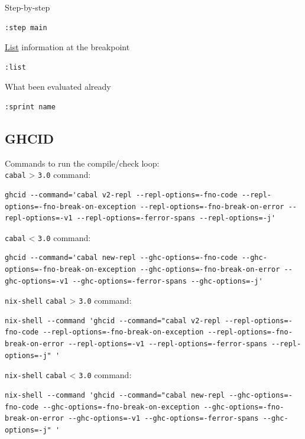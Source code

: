 \documentclass[11pt]{article}
\begin{document}
Step-by-step\\
\begin{verbatim}
:step main
\end{verbatim}

\hyperref[org8ae0f28]{List} information at the breakpoint\\
\begin{verbatim}
:list
\end{verbatim}

What been evaluated already\\
\begin{verbatim}
:sprint name
\end{verbatim}

\subsection{\label{org03f95e6}GHCID}
\label{sec:orgedd3dea}

Commands to run the compile/check loop:\\

\texttt{cabal} > \texttt{3.0} command:\\
\begin{verbatim}
ghcid --command='cabal v2-repl --repl-options=-fno-code --repl-options=-fno-break-on-exception --repl-options=-fno-break-on-error --repl-options=-v1 --repl-options=-ferror-spans --repl-options=-j'
\end{verbatim}

\texttt{cabal} < \texttt{3.0} command:\\
\begin{verbatim}
ghcid --command='cabal new-repl --ghc-options=-fno-code --ghc-options=-fno-break-on-exception --ghc-options=-fno-break-on-error --ghc-options=-v1 --ghc-options=-ferror-spans --ghc-options=-j'
\end{verbatim}

\texttt{nix-shell} \texttt{cabal} > \texttt{3.0} command:\\
\begin{verbatim}
nix-shell --command 'ghcid --command="cabal v2-repl --repl-options=-fno-code --repl-options=-fno-break-on-exception --repl-options=-fno-break-on-error --repl-options=-v1 --repl-options=-ferror-spans --repl-options=-j" '
\end{verbatim}

\texttt{nix-shell} \texttt{cabal} < \texttt{3.0} command:\\
\begin{verbatim}
nix-shell --command 'ghcid --command="cabal new-repl --ghc-options=-fno-code --ghc-options=-fno-break-on-exception --ghc-options=-fno-break-on-error --ghc-options=-v1 --ghc-options=-ferror-spans --ghc-options=-j" '

\end{verbatim}
\end{document}
